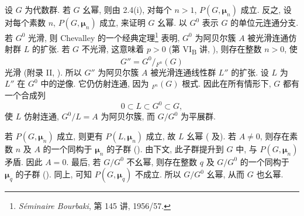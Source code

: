 设 \(G\) 为代数群. 若 \(G\) 幺幂, 则由 2.4(i), 对每个 \(n>1\),
\(P(G,\boldsymbol\mu_n)\) 成立.
反之, 设对每个素数 \(n\), \(P(G,\boldsymbol\mu_n)\) 成立, 来证明 \(G\) 幺幂.
以 \(G^0\) 表示 \(G\) 的单位元连通分支.
若 \(G^0\) 光滑, 则 Chevalley 的一个经典定理\begingroup\renewcommand{\thefootnote}{*}\footnote[0]{%
\emph{Séminaire Bourbaki}, 第 145 讲, 1956/57.}\endgroup
表明, \(G^0\) 为阿贝尔簇 \(A\) 被光滑连通仿射群 \(L\) 的扩张.
若 \(G\) 不光滑, 这意味着 \(p>0\)
(第 VI\textsubscript{B} 讲, ),
则存在整数 \(n>0\), 使
\[
  G''=G^0/{}_{F^n}(G)
\]
光滑 (附录 II, ).
所以 \(G''\) 为阿贝尔簇 \(A\) 被光滑连通线性群 \(L''\) 的扩张.
设 \(L\) 为 \(L''\) 在 \(G^0\) 中的逆像.
它仍仿射连通, 因为 \({}_{F^n}(G)\) 根式.
因此在所有情形下, \(G\) 都有一个合成列
\[
  0\subset L\subset G^0\subset G,
\]
使 \(L\) 仿射连通, \(G^0/L=A\) 为阿贝尔簇, 而 \(G/G^0\) 为平展群.

若 \(P(G,\boldsymbol\mu_n)\) 成立, 则更有 \(P(L,\boldsymbol\mu_n)\) 成立,
故 \(L\) 幺幂 (
及).
若 \(A\ne0\), 则存在素数 \(n\) 及 \(A\) 的一个同构于 \(\boldsymbol\mu_n\) 的子群
().
由下文, 此子群提升到 \(G\) 中,
与 \(P(G,\boldsymbol\mu_n)\) 矛盾. 因此 \(A=0\).
最后, 若 \(G/G^0\) 不幺幂, 则存在整数 \(q\) 及 \(G/G^0\)
的一个同构于 \(\boldsymbol\mu_q\) 的子群 ().
同上, 可知 \(P(G,\boldsymbol\mu_q)\) 不成立.
所以 \(G/G^0\) 幺幂, 从而 \(G\) 也幺幂.



